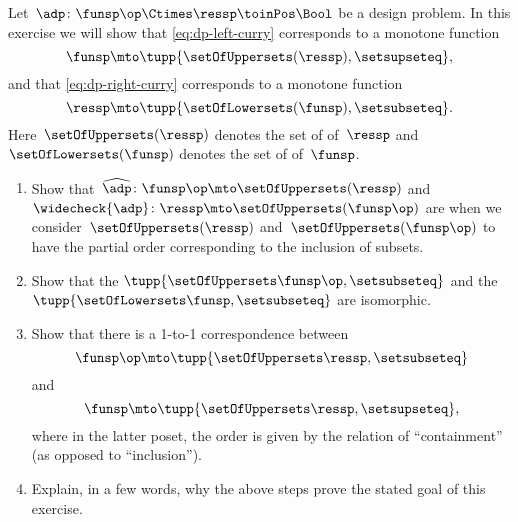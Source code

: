 \begin{gradedexercise}
    \label{ex:CurryingDesignProblems}
    Let~$\adp\colon \funsp\op \Ctimes \ressp\toinPos \Bool$ be a design problem.
    In this exercise we will show that \cref{eq:dp-left-curry} corresponds to a monotone function
    \begin{equation}
        \funsp \mto \tupp{\setOfUppersets (\ressp), \setsupseteq},
    \end{equation}
    and that \cref{eq:dp-right-curry} corresponds to a monotone function
    \begin{equation}
        \ressp \mto \tupp{\setOfLowersets(\funsp), \setsubseteq}.
    \end{equation}
    Here~$\setOfUppersets (\ressp)$ denotes the set of  of~$\ressp$ and~$\setOfLowersets(\funsp)$ denotes the set of  of~$\funsp$.

    \begin{enumerate}
        \item Show that~$\widehat{\adp} \colon \funsp\op \mto \setOfUppersets (\ressp)$ and~$\widecheck{\adp} \colon \ressp \mto \setOfUppersets (\funsp\op)$ are  when we consider~$\setOfUppersets (\ressp)$ and~$\setOfUppersets (\funsp\op)$ to have the partial order corresponding to the inclusion of subsets.
        \item Show that the  $\tupp{\setOfUppersets\funsp\op, \setsubseteq}$ and the  $\tupp{\setOfLowersets\funsp, \setsubseteq}$ are isomorphic.
        \item Show that there is a 1-to-1 correspondence between   \begin{equation}
                  \funsp\op \mto \tupp{\setOfUppersets \ressp, \setsubseteq}
              \end{equation}
              and   \begin{equation}
                  \funsp \mto \tupp{\setOfUppersets \ressp, \setsupseteq},
              \end{equation}
              where in the latter poset, the order is given by the relation of ``containment'' (as opposed to ``inclusion'').
        \item Explain, in a few words, why the above steps prove the stated goal of this exercise.
    \end{enumerate}
\end{gradedexercise}

